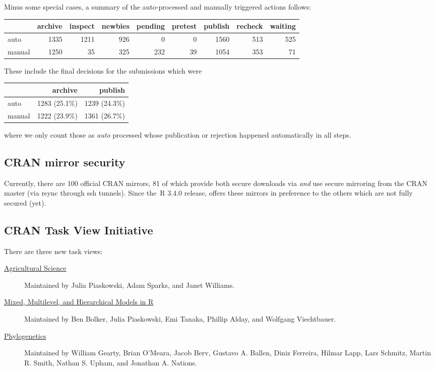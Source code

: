 Minus some special cases, a summary of the auto-processed and manually 
triggered actions follows:
\begin{center}
\setlength{\tabcolsep}{2pt}
\begin{tabular}{l|rrrrrrrr}
  & archive & inspect & newbies & pending & pretest & publish & recheck 
& waiting \\ \hline
auto & 1335 & 1211 & 926 & 0 & 0 & 1560 & 513 & 525 \\
manual & 1250 & 35 & 325 & 232 & 39 & 1054 & 353 & 71
\end{tabular}
\end{center}

These include the final decisions for the submissions which were
\begin{center}
\begin{tabular}{l|rr}
  & archive & publish \\ \hline
auto & 1283 (25.1\%) & 1239 (24.3\%) \\
manual & 1222 (23.9\%) & 1361 (26.7\%)
\end{tabular}
\end{center}
where we only count those as \emph{auto} processed whose publication or
rejection happened automatically in all steps.

\subsection{CRAN mirror security}


Currently, there are 100 official CRAN mirrors, 81 of which provide both
secure downloads via  \emph{and} use secure mirroring from
the CRAN master (via rsync through ssh tunnels).  Since the~R 3.4.0
release,  offers these mirrors in preference to
the others which are not fully secured (yet).

\subsection{CRAN Task View Initiative}

There are three new task views:
\begin{description}
 \item[\href{https://CRAN.R-project.org/view=Agriculture}{Agricultural Science}]
  Maintained by Julia Piaskowski, Adam Sparks, and Janet Williams.
 \item[\href{https://CRAN.R-project.org/view=MixedModels}{Mixed, Multilevel, and Hierarchical Models in R}]
  Maintained by Ben Bolker, Julia Piaskowski, Emi Tanaka, Phillip Alday,
  and Wolfgang Viechtbauer.
 \item[\href{https://CRAN.R-project.org/view=Phylogenetics}{Phylogenetics}]
  Maintained by William Gearty, Brian O'Meara, Jacob Berv, Gustavo
  A. Ballen, Diniz Ferreira, Hilmar Lapp, Lars Schmitz, Martin R. Smith,
  Nathan S. Upham, and Jonathan A. Nations. 
\end{description}

